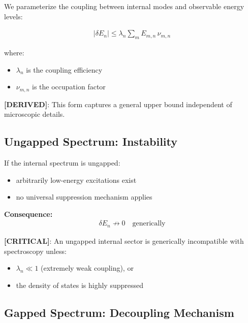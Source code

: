\documentclass[11pt]{article}
\theoremstyle{definition}
\theoremstyle{plain}
\theoremstyle{remark}
\begin{document}
        We parameterize the coupling between internal modes and observable energy levels:
        
        \begin{align}
            |\delta E_n| \leq \lambda_n \sum_m E_{m,n} \, \nu_{m,n}
            \label{eq:coupling_bound}
        \end{align}
        
        where:
        \begin{itemize}
            \item $\lambda_n$ is the coupling efficiency
            \item $\nu_{m,n}$ is the occupation factor
        \end{itemize}
        
        \textbf{[DERIVED]}: This form captures a general upper bound independent of microscopic details.
    
    \subsection{Ungapped Spectrum: Instability}
        
        If the internal spectrum is ungapped:
        
        \begin{itemize}
            \item arbitrarily low-energy excitations exist
            \item no universal suppression mechanism applies
        \end{itemize}
        
        \textbf{Consequence:}
        \begin{align}
            \delta E_n \not\to 0 \quad \text{generically}
        \end{align}
        
        \textbf{[CRITICAL]}:
        An ungapped internal sector is generically incompatible with spectroscopy unless:
        
        \begin{itemize}
            \item $\lambda_n \ll 1$ (extremely weak coupling), or
            \item the density of states is highly suppressed
        \end{itemize}
    
    \subsection{Gapped Spectrum: Decoupling Mechanism}
        
\end{document}
